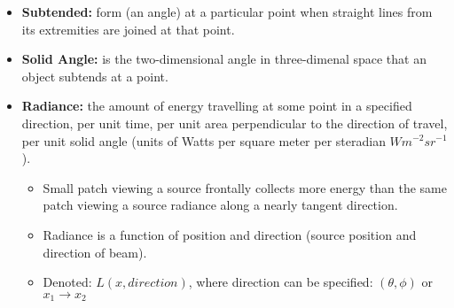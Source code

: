 \begin{itemize}[--]
	\item \textbf{Subtended:} form (an angle) at a particular point when straight lines from its extremities are joined at that point.
	\item \textbf{Solid Angle:} is the two-dimensional angle in three-dimenal space that an object subtends at a point.
	\item \textbf{Radiance:} the amount of energy travelling at some point in a specified direction, per unit time, per unit area perpendicular to the direction of travel, per unit solid angle (units of Watts per square meter per steradian $Wm^{-2}sr^{-1}$).
	\begin{itemize}[--]
		\item Small patch viewing a source frontally collects more energy than the same patch viewing a source radiance along a nearly tangent direction.
		\item Radiance is a function of position and direction (source position and direction of beam).
		\item Denoted: $L(x, direction)$, where direction can be specified: $(\theta, \phi)$ or $x_1\to x_2$
	\end{itemize}
\end{itemize}